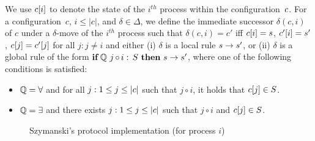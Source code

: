 We use $c[i]$ to denote the state of the $i^{th}$ process within the
configuration~$c$.
%
For a configuration~$c$, $i\leq |c|$, and $\delta\in\Delta$, we define
the immediate successor $\delta(c,i)$ of $c$ under a $\delta$-move of
the $i^{th}$ process such that $\delta(c,i) = c'$ iff $c[i] =
s$, $c'[i] = s'$, $c[j]=c'[j]$ for all $j:j\neq i$
and either (i) $\delta$ is a local rule $s\rightarrow s'$, or (ii)
$\delta$ is a global rule of the form
$\quantrule\loc{\loc'}{\quantify}\circ S$, where one of the following
conditions is satisfied:
\begin{itemize}%
\item 
$\mathbb{Q}=\forall$ and for all $j:1\leq j\leq |c|$ such that $j\circ i$, it holds that $c[j]\in S$.
\item 
$\mathbb{Q}=\exists$ and there exists $j:1\leq j\leq |c|$ such that $j\circ i$ and $c[j]\in S$.
\end{itemize}
%


\begin{figure}[!t]
  \centering
  \vspace{-3mm}
  \caption{Szymanski's protocol implementation (for process $i$)}
  \label{figure:SzymanskiImplementation}
\end{figure}


